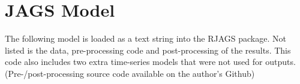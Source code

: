 \documentclass[a4paper, 12pt]{article}
\begin{document}
\newpage
\section{JAGS Model} \label{sec:jagscode}
The following model is loaded as a text string into the RJAGS package. Not listed is the data, pre-processing code and post-processing of the results. This code also includes two extra time-series models that were not used for outputs. (Pre-/post-processing source code available on the author's Github)


\end{document}
